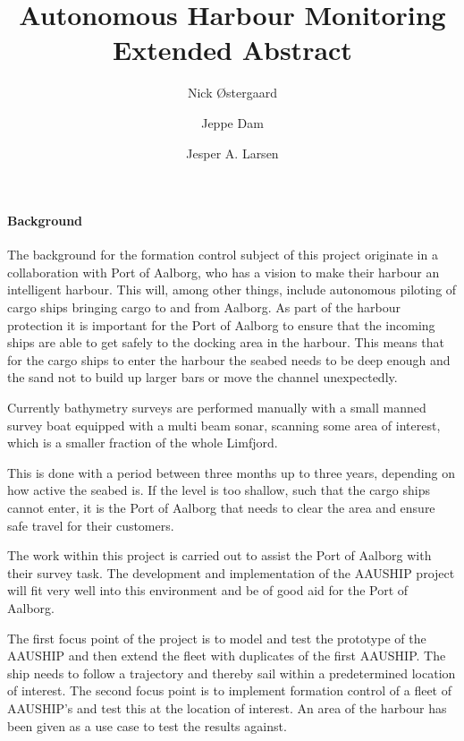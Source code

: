 \documentclass[a4paper,12pt]{article}
\begin{document}
\title{\vspace{-2cm}Autonomous Harbour Monitoring\\
\vspace{0.3cm}\small{Extended Abstract}}
\author{Nick Østergaard \and Jeppe Dam \and Jesper A. Larsen}
\maketitle


\paragraph{Background}
The background for the formation control subject of this project
originate in a collaboration with Port of Aalborg, who has a vision to
make their harbour an intelligent harbour. This will, among other
things, include autonomous piloting of cargo ships bringing cargo to
and from Aalborg. As part of the harbour protection it is important
for the Port of Aalborg to ensure that the incoming ships are able to
get safely to the docking area in the harbour. This means that for the
cargo ships to enter the harbour the seabed needs to be deep enough
and the sand not to build up larger bars or move the channel
unexpectedly.

Currently bathymetry surveys are performed manually with a small
manned survey boat equipped with a multi beam sonar, scanning some
area of interest, which is a smaller fraction of the whole Limfjord.

This is done with a period between three months up to three years,
depending on how active the seabed is. If the level is too shallow,
such that the cargo ships cannot enter, it is the Port of Aalborg that
needs to clear the area and ensure safe travel for their customers.

The work within this project is carried out to assist the Port of
Aalborg with their survey task. The development and implementation of
the AAUSHIP project will fit very well into this environment and be of
good aid for the Port of Aalborg.

The first focus point of the project is to model and test the
prototype of the AAUSHIP and then extend the fleet with duplicates of
the first AAUSHIP. The ship needs to follow a trajectory and thereby
sail within a predetermined location of interest. The second focus
point is to implement formation control of a fleet of AAUSHIP's and
test this at the location of interest. An area of the harbour has been
given as a use case to test the results against.
\end{document}
